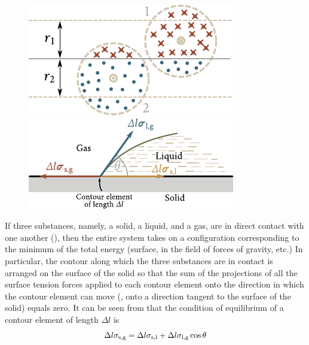 \begin{figure}[t]
	\begin{minipage}[t]{0.5\linewidth}
		\begin{center}
			\includegraphics[scale=1]{figures/ch_14/fig_14_6.pdf}
			\caption[]{}
			\label{fig:14_6}
		\end{center}
	\end{minipage}
	\hspace{-0.05cm}
	\begin{minipage}[t]{0.5\linewidth}
		\begin{center}
			\includegraphics[scale=1]{figures/ch_14/fig_14_7.pdf}
			\caption[]{}
			\label{fig:14_7}
		\end{center}
	\end{minipage}
	\vspace{-0.4cm}
\end{figure}

If three substances, namely, a solid, a liquid, and a gas, are in direct contact with one another (), then the entire system takes on a configuration corresponding to the minimum of the total energy (surface, in the field of forces of gravity, etc.) In particular, the contour along which the three substances are in contact is arranged on the surface of the solid so that the sum of the projections of all the surface tension forces applied to each contour element onto the direction in which the contour element can move (\ie, onto a direction tangent to the surface of the solid) equals zero. It can be seen from  that the condition of equilibrium of a contour element of length $\Delta l$ is
\begin{equation}\label{eq:14_5}
	\Delta l \sigma_{\text{s,g}} = \Delta l \sigma_{\text{s,l}} + \Delta l \sigma_{\text{l,g}}\cos\theta
\end{equation}

